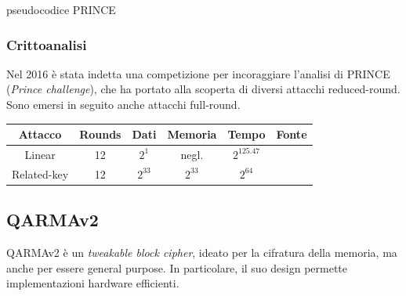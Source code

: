 \documentclass[target=bach,aauheader=,style=]{thud}
\begin{document}
			\begin{algorithm}
				\caption{pseudocodice PRINCE}
				\begin{algorithmic}
					\EndFor
					\EndFor
					\EndProcedure
				\end{algorithmic}
			\end{algorithm}
			
			\subsubsection{Crittoanalisi}
			Nel 2016 è stata indetta una competizione per incoraggiare l'analisi di PRINCE (\textit{Prince challenge}), che ha portato alla scoperta di diversi attacchi reduced-round. Sono emersi in seguito anche attacchi full-round.
			\begin{center}
				\begin{tabular}{ |c|c|c|c|c|c| } 
					\hline
					Attacco & Rounds & Dati & Memoria & Tempo & Fonte \\ 
					\hline 
					\hline
					Linear & 12 & $2^1$ & negl. & $2^{125.47}$ & \cite{princesec}\\
					\hline
					Related-key & 12 & $2^33$ & $2^33$ & $2^{64}$ & \cite{princesec}\\
					\hline
				\end{tabular}
			\end{center}
		\subsection{QARMAv2}\cite{qarmav2}
		QARMAv2 è un \textit{tweakable block cipher}, ideato per la cifratura della memoria, ma anche per essere general purpose. In particolare, il suo design permette implementazioni hardware efficienti.
\end{document}
